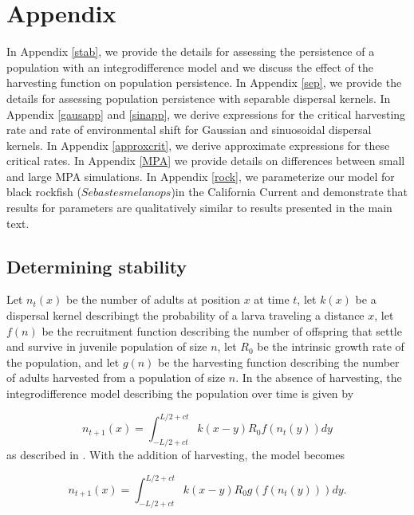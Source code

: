 \documentclass[12pt,english]{article}
\begin{document}
\renewcommand{\thefigure}{S\arabic{figure}}
 \renewcommand{\thetable}{S\arabic{table}}

\appendix
\section{Appendix}
In Appendix \ref{stab}, we provide the details for assessing the persistence of a population with an integrodifference model and we discuss the effect of the harvesting function on population persistence.  In Appendix \ref{sep}, we provide the details for assessing population persistence with separable dispersal kernels.  In Appendix \ref{gausapp} and \ref{sinapp}, we derive expressions for the critical harvesting rate and rate of environmental shift for Gaussian and sinuosoidal dispersal kernels.  In Appendix \ref{approxcrit}, we derive approximate expressions for these critical rates. In Appendix \ref{MPA} we provide details on differences between small and large MPA simulations. In Appendix \ref{rock}, we parameterize our model for black rockfish ($Sebastes melanops$)in the California Current and demonstrate that results for  parameters  are qualitatively similar to results  presented in the main text. 


\subsection{Determining stability \label{stab}}
Let $n_t(x)$ be the number of adults at position $x$ at time $t$, let $k(x)$ be a dispersal kernel describingt the probability of a larva traveling a distance $x$, let $f(n)$ be the recruitment function describing the number of offspring that settle and survive in juvenile population of size $n$, let $R_0$ be the intrinsic growth rate of the population, and let $g(n)$ be the harvesting function describing the number of adults harvested from a population of size $n$.  In the absence of harvesting, the integrodifference model describing the population over time is given by 

\begin{equation} n_{t+1}(x)=\int_{-L/2+ct}^{L/2+ct}k(x-y)R_0f(n_t(y))dy \label{integro} \end{equation}
as described in \citet{ZhouKot2011}.  With the addition of harvesting, the model becomes

\begin{equation} n_{t+1}(x)=\int_{-L/2+ct}^{L/2+ct}k(x-y)R_0g(f(n_t(y)))dy. \label{integro} \end{equation}
\end{document}
